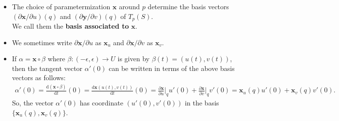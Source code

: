 \documentclass[10pt]{article}
\newcommand{\dee}{\mathrm{d}}
\newcommand{\ve}[1]{\mathbf{#1}}
\newcommand{\ra}{\rightarrow}
\begin{document}
\begin{itemize}
    \item The choice of parametermization $\ve{x}$ around $p$ determine the basis vectors $(\partial\ve{x}/\partial u)(q)$ and $(\partial\ve{y}/\partial v)(q)$ of $T_p(S)$.\\
    We call them the {\bf basis associated to} $\ve{x}$\textbf{}.

    \item We sometimes write $\partial\ve{x}/\partial u$ as $\ve{x}_u$ and $\partial\ve{x}/\partial v$ as $\ve{x}_v$.

    \item If $\alpha = \ve{x} \circ \beta$ where $\beta: (-\epsilon, \epsilon) \ra U$ is given by $\beta(t) = (u(t),v(t))$, then the tangent vector $\alpha'(0)$ can be written in terms of the above basis vectors as follows:
    \begin{align*}
      \alpha'(0) = \frac{\dee (\ve{x} \circ \beta)}{\dee t} (0) = \frac{\dee \ve{x}(u(t), v(t))}{\dee t} (0) = \frac{\partial \ve{x}}{\partial u} \bigg|_q u'(0) + \frac{\partial \ve{x}}{\partial v} \bigg|_q v'(0) = \ve{x}_u(q) u'(0) + \ve{x}_v(q) v'(0).
    \end{align*}
    So, the vector $\alpha'(0)$ has coordinate $(u'(0), v'(0))$ in the basis $\{ \ve{x}_u(q), \ve{x}_v(q) \}$.    
  \end{itemize}
  
\end{document}
